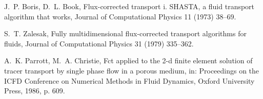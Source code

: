 \documentclass[xchauthor,chkrefs,fixeqskip,GCNS,amsmath,amsthm]{yjcphg}
\theoremstyle{remark}
\begin{document}
\begin{backmatter}
\begin{thebibliography}{}
\begin{bsubitem}
\begin{bcontribution}%
\end{bcontribution}
\begin{bhost}
\begin{bissue}
\end{bissue}
\end{bhost}
\end{bsubitem}
%
\OrigBibText
J.~P. Boris, D.~L. Book, Flux-corrected transport i. SHASTA, a fluid
transport algorithm that works, Journal of Computational Physics 11
(1973) 38--69.
\endOrigBibText
{}%
\endbibitem

\begin{bsubitem}
\begin{bcontribution}%
\end{bcontribution}
\begin{bhost}
\begin{bissue}
\end{bissue}
\end{bhost}
\end{bsubitem}
%
\OrigBibText
S.~T. Zalesak, Fully multidimensional flux-corrected transport
algorithms for fluids, Journal of Computational Physics 31 (1979)
335--362.
\endOrigBibText
{}%
\endbibitem

\begin{bsubitem}
\begin{bcontribution}%
\end{bcontribution}
\begin{bhost}
\begin{beditedbook}
\end{beditedbook}
\end{bhost}
\end{bsubitem}
%
\OrigBibText
A.~K. Parrott, M.~A. Christie, Fct applied to the 2-d finite element
solution of tracer transport by single phase flow in a porous medium,
in: Proceedings on the ICFD Conference on Numerical Methods in Fluid
Dynamics, Oxford University Press, 1986, p. 609.
\endOrigBibText
{}%
\endbibitem


\end{thebibliography}
\end{backmatter}
\end{document}

